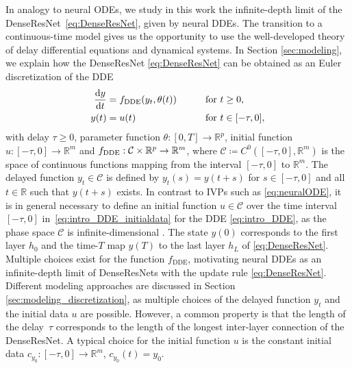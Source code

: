 \documentclass[10pt]{article}
\numberwithin{equation}{section}
\newcommand*{\dd}{\mathrm{d}}
\newcommand{\R}{\mathbb{R}}
\begin{document}
	In analogy to neural ODEs, we study in this work the infinite-depth limit of the DenseResNet~\eqref{eq:DenseResNet}, given by neural DDEs. The transition to a continuous-time model gives us the opportunity to use the well-developed theory of delay differential equations and dynamical systems. In Section \ref{sec:modeling}, we explain how the DenseResNet \eqref{eq:DenseResNet} can be obtained as an Euler discretization of the DDE
	\begin{align}
		\label{eq:intro_DDE} \frac{\dd y}{\dd t} &= f_\textup{DDE}(y_t,\theta(t)) \qquad &&\text{for } t\geq 0, \\  
		\label{eq:intro_DDE_initialdata} y(t) &= u(t) &&\text{for } t \in [-\tau,0],
	\end{align}
	with delay $\tau \geq 0$,  parameter function $\theta:[0,T]\rightarrow  \mathbb{R}^{ p}$, initial function $u:[-\tau,0]\rightarrow \R^m$ and $f_\textup{DDE}: \mathcal{C}\times \mathbb{R}^{p} \rightarrow \mathbb{R}^m$, where $\mathcal{C}\coloneqq C^0([-\tau,0],\mathbb{R}^m)$ is the space of continuous functions mapping from the interval $[-\tau,0]$ to $\mathbb{R}^m$. The delayed function $y_t \in \mathcal{C}$ is  defined by $y_t(s) = y(t+s)$ for $s\in [-\tau,0]$ and all $t\in\mathbb{R}$ such that $y(t+s)$ exists. In contrast to IVPs such as \eqref{eq:neuralODE}, it is in general necessary to define an initial function $u \in \mathcal{C}$ over the time interval $[-\tau,0]$ in~\eqref{eq:intro_DDE_initialdata} for the DDE \eqref{eq:intro_DDE}, as the phase space $\mathcal{C}$ is infinite-dimensional \cite{Hale1993}. The state $y(0)$ corresponds to the first layer $h_0$ and the time-$T$ map $y(T)$ to the last layer $h_L$ of \eqref{eq:DenseResNet}. Multiple choices exist for the function $f_\text{DDE}$, motivating neural DDEs as an infinite-depth limit of DenseResNets with the update rule \eqref{eq:DenseResNet}. Different modeling approaches are discussed in Section \ref{sec:modeling_discretization}, as multiple choices of the delayed function $y_t$ and the initial data $u$ are possible. However, a common property is that the length of the delay~$\tau$ corresponds to the length of the longest inter-layer connection of the DenseResNet. A typical choice for the initial function $u$ is the constant initial data $c_{y_0}:[-\tau,0] \rightarrow \mathbb{R}^m$, $c_{y_0}(t) = y_0$.
	
\end{document}
